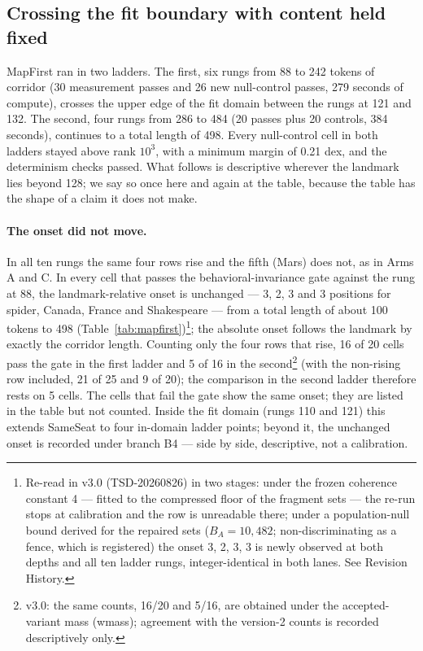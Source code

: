 \documentclass[11pt]{article}
\begin{document}
\subsection{Crossing the fit boundary with content held fixed}

\label{sec:results2}

MapFirst ran in two ladders. The first, six rungs from 88 to 242 tokens of corridor (30 measurement passes and 26 new null-control passes, 279 seconds of compute), crosses the upper edge of the fit domain between the rungs at 121 and 132. The second, four rungs from 286 to 484 (20 passes plus 20 controls, 384 seconds), continues to a total length of 498. Every null-control cell in both ladders stayed above rank $10^3$, with a minimum margin of 0.21 dex, and the determinism checks passed. What follows is descriptive wherever the landmark lies beyond 128; we say so once here and again at the table, because the table has the shape of a claim it does not make.

\paragraph{The onset did not move.} In all ten rungs the same four rows rise and the fifth (Mars) does not, as in Arms A and C. In every cell that passes the behavioral-invariance gate against the rung at 88, the landmark-relative onset is unchanged --- 3, 2, 3 and 3 positions for spider, Canada, France and Shakespeare --- from a total length of about 100 tokens to 498 (Table~\ref{tab:mapfirst})\footnote{Re-read in v3.0 (TSD-20260826) in two stages: under the frozen coherence constant 4 --- fitted to the compressed floor of the fragment sets --- the re-run stops at calibration and the row is unreadable there; under a population-null bound derived for the repaired sets ($B_A = 10{,}482$; non-discriminating as a fence, which is registered) the onset 3, 2, 3, 3 is newly observed at both depths and all ten ladder rungs, integer-identical in both lanes. See Revision History.}; the absolute onset follows the landmark by exactly the corridor length. Counting only the four rows that rise, 16 of 20 cells pass the gate in the first ladder and 5 of 16 in the second\footnote{v3.0: the same counts, 16/20 and 5/16, are obtained under the accepted-variant mass (wmass); agreement with the version-2 counts is recorded descriptively only.} (with the non-rising row included, 21 of 25 and 9 of 20); the comparison in the second ladder therefore rests on 5 cells. The cells that fail the gate show the same onset; they are listed in the table but not counted. Inside the fit domain (rungs 110 and 121) this extends SameSeat to four in-domain ladder points; beyond it, the unchanged onset is recorded under branch B4 --- side by side, descriptive, not a calibration.
\end{document}
